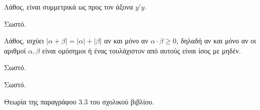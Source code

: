 
\begin{alist}
\item 
\begin{rlist}
\item Λάθος, είναι συμμετρικά ως προς τον άξονα $y'y$.
\item Σωστό.
\item Λάθος, ισχύει $|\alpha + \beta| = |\alpha| + |\beta|$ αν και μόνο αν $\alpha \cdot \beta \ge 0$, δηλαδή αν και μόνο αν οι
αριθμοί $\alpha, \beta$ είναι ομόσημοι ή ένας τουλάχιστον από αυτούς είναι ίσος με μηδέν.
\item Σωστό.
\item Σωστό.
\end{rlist}

\item Θεωρία της παραγράφου 3.3 του σχολικού βιβλίου.
\end{alist}

